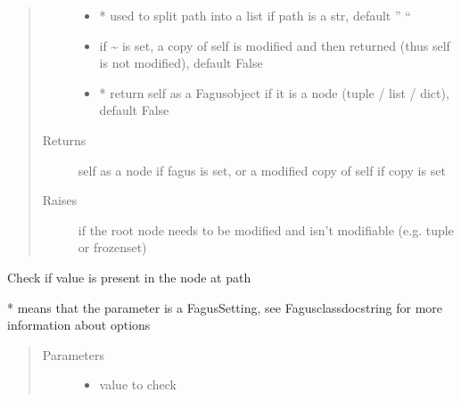 \documentclass[a4paper,10pt,english]{sphinxmanual}
\begin{document}
\begin{fulllineitems}
\begin{fulllineitems}
\begin{quote}
\begin{description}
\begin{itemize}
\item {}
\sphinxAtStartPar
{} \textendash{} * used to split path into a list if path is a str, default ” “

\item {}
\sphinxAtStartPar
{} \textendash{} if \textasciitilde{} is set, a copy of self is modified and then returned (thus self is not modified), default False

\item {}
\sphinxAtStartPar
{} \textendash{} * return self as a Fagus\sphinxhyphen{}object if it is a node (tuple / list / dict), default False

\end{itemize}

\item[{Returns}] \leavevmode
\sphinxAtStartPar
self as a node if fagus is set, or a modified copy of self if copy is set

\item[{Raises}] \leavevmode
\sphinxAtStartPar
{} \textendash{} if the root node needs to be modified and isn’t modifiable (e.g. tuple or frozenset)

\end{description}\end{quote}

\end{fulllineitems}


\begin{fulllineitems}
\label{\detokenize{fagus.fagus:fagus.fagus.Fagus.contains}}
\pysigstartsignatures
{}
\pysigstopsignatures
\sphinxAtStartPar
Check if value is present in the node at path

\sphinxAtStartPar
* means that the parameter is a Fagus\sphinxhyphen{}Setting, see Fagus\sphinxhyphen{}class\sphinxhyphen{}docstring for more information about options
\begin{quote}\begin{description}
\item[{Parameters}] \leavevmode\begin{itemize}
\item {}
\sphinxAtStartPar
{} \textendash{} value to check


\end{itemize}
\end{description}
\end{quote}
\end{fulllineitems}
\end{fulllineitems}
\end{document}
